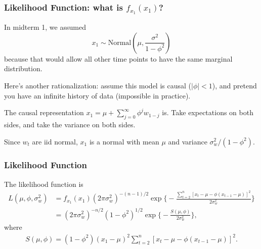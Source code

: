 \documentclass[%
xcolor=pdftex]{beamer}
\begin{document}
\begin{frame}
\frametitle{Likelihood Function: what is $f_{x_1}(x_1)$?}

In midterm 1, we assumed 
$$
x_1 \sim \text{Normal}\left(\mu, \frac{\sigma^2}{1-\phi^2} \right)
$$
because that would allow all other time points to have the same marginal distribution.
\newline

Here's another rationalization: assume this model is causal ($|\phi|<1$), and pretend you have an infinite history of data (impossible in practice).
\newline

The causal representation $x_1=\mu+\sum^\infty_{j=0} \phi^j
w_{1-j}$ is. Take expectations on both sides, and take the variance on both sides. 
\newline

Since $w_t$ are iid normal, $x_1$ is a normal with mean $\mu$ and variance $\sigma^2_w/(1-\phi^2)$.


\end{frame}

\begin{frame}
\frametitle{Likelihood Function}

The likelihood function is
\begin{align*}
L(\mu,\phi,\sigma^2_w) &= f_{x_1}(x_1) (2\pi \sigma^2_w)^{-(n-1)/2} \exp \Big \{ -\frac{ \sum^n_{t=2} [x_t-\mu-\phi(x_{t-1}-\mu)]^2 }{2\sigma^2_w} \Big \}\\
&= (2\pi \sigma^2_w)^{-n/2}(1 - \phi^2)^{1/2} \exp \Big \{ -\frac{ S(\mu,\phi) }{2\sigma^2_w} \Big \},
\end{align*}
where
\begin{eqnarray*}
S(\mu,\phi) = (1-\phi^2)(x_1 - \mu)^2 \sum^n_{t=2} [x_t-\mu-\phi(x_{t-1}-\mu)]^2.
\end{eqnarray*}

\end{frame}




%
%
%
%
%
\end{document}
